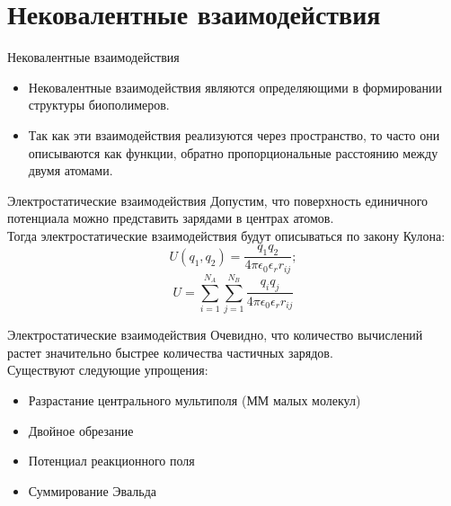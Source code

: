 \section{Нековалентные взаимодействия}
\begin{frame}{Нековалентные взаимодействия}
 \begin{itemize}
  \item
Нековалентные взаимодействия являются определяющими в формировании структуры биополимеров. 
\vspace{0.2cm}
  \item
Так как эти взаимодействия реализуются через пространство, то часто они описываются как функции, обратно пропорциональные расстоянию между двумя атомами.
  \end{itemize}
\end{frame}

\begin{frame}{Электростатические  взаимодействия}
Допустим, что поверхность единичного потенциала можно представить зарядами в центрах атомов.\\
Тогда электростатические взаимодействия будут описываться по закону Кулона:
\[ U(q_1 ,q_2)= \frac{q_1 q_2}{4\pi \epsilon_0 \epsilon_r r_{ij}} ;  \]
\[ U= \sum_{i=1}^{N_A} \sum_{j=1}^{N_B} \frac{q_i q_j}{4\pi \epsilon_0 \epsilon_r r_{ij}}  \]
\end{frame}

\begin{frame}{Электростатические  взаимодействия}
Очевидно, что количество вычислений растет значительно быстрее количества частичных зарядов. \\
Существуют следующие упрощения:\vspace{0.5cm}
 \begin{itemize}
\item
Разрастание центрального мультиполя (ММ малых молекул)
\vspace{0.2cm}
  \item
Двойное обрезание
\vspace{0.2cm}
  \item
Потенциал реакционного поля
\vspace{0.2cm}
  \item
Суммирование Эвальда
  \end{itemize}
\end{frame}

